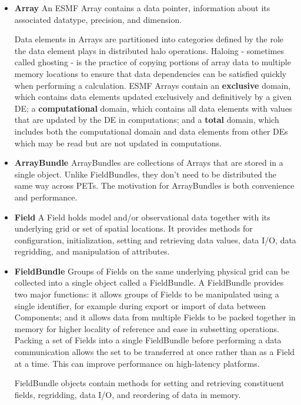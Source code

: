 \begin{itemize}

\item {\bf Array}  An ESMF Array contains a data pointer, 
information about its associated datatype, precision, and 
dimension.  

Data elements in Arrays are partitioned into categories 
defined by the role the data element plays in distributed halo 
operations.  Haloing - sometimes called ghosting - is the 
practice of copying portions of array data to multiple memory 
locations to ensure that data dependencies can be satisfied 
quickly when performing a calculation.  ESMF Arrays contain 
an {\bf exclusive} domain, which contains data elements
updated exclusively and definitively by a given DE; a 
{\bf computational} domain, which contains all data elements
with values that are updated by the DE in computations; and 
a {\bf total} domain, which includes both the computational 
domain and data elements from other DEs which may be read 
but are not updated in computations.

\item {\bf ArrayBundle} ArrayBundles are collections of
Arrays that are stored in a single object.  Unlike FieldBundles,
they don't need to be distributed the same way across PETs.  The
motivation for ArrayBundles is both convenience and performance.

\item {\bf Field}  A Field holds model and/or observational 
data together with its underlying grid or set of spatial 
locations.  It provides methods for configuration, 
initialization, setting and retrieving data values, 
data I/O, data regridding, and manipulation of attributes.

\item {\bf FieldBundle} Groups of Fields on the same underlying 
physical grid can be collected into a single object called a FieldBundle.  
A FieldBundle provides two major functions: it allows groups of 
Fields to be manipulated using a single identifier, for example 
during export or import of data between Components; and 
it allows data from multiple Fields to be packed together 
in memory for higher locality of reference and ease in 
subsetting operations.  Packing a set of Fields into a single
FieldBundle before performing a data communication allows the set 
to be transferred at once rather than as a Field at a time.
This can improve performance on high-latency platforms.

FieldBundle objects contain methods for setting and retrieving constituent 
fields, regridding, data I/O, and reordering of data in memory.

\end{itemize}

